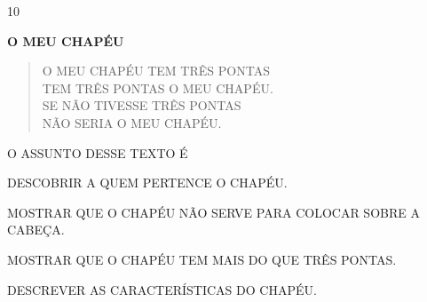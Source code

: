 



\num{10}

\textbf{O MEU CHAPÉU}

\begin{verse}
O MEU CHAPÉU TEM TRÊS PONTAS\\
TEM TRÊS PONTAS O MEU CHAPÉU.\\
SE NÃO TIVESSE TRÊS PONTAS\\
NÃO SERIA O MEU CHAPÉU.

\end{verse}


O ASSUNTO DESSE TEXTO É

\begin{escolha}
\item DESCOBRIR A QUEM PERTENCE O CHAPÉU.

\item MOSTRAR QUE O CHAPÉU NÃO SERVE PARA COLOCAR SOBRE A CABEÇA.

\item MOSTRAR QUE O CHAPÉU TEM MAIS DO QUE TRÊS PONTAS.

\item DESCREVER AS CARACTERÍSTICAS DO CHAPÉU.
\end{escolha}

